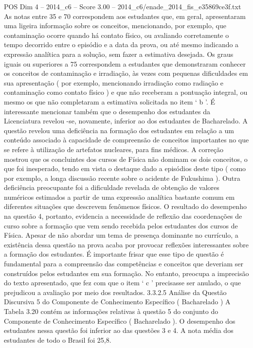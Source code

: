 \begin{textsample}{POS Dim 4 – 2014\_c6 – Score 3.00 – 2014\_c6/enade\_2014\_fis\_e35869ce3f.txt}
As notas entre 35 e 70 correspondem aos estudantes que, em geral, apresentaram uma ligeira informação sobre os conceitos, mencionando, por exemplo, que contaminação ocorre quando há contato físico, ou avaliando corretamente o tempo decorrido entre o episódio e a data da prova, ou até mesmo indicando a expressão analítica para a solução, sem fazer a estimativa desejada.
Os graus iguais ou superiores a 75 correspondem a estudantes que demonstraram conhecer os conceitos de contaminação e irradiação, às vezes com pequenas dificuldades em sua apresentação ( por exemplo, mencionando irradiação como radiação e contaminação como contato físico ) e que não receberam a pontuação integral, ou mesmo os que não completaram a estimativa solicitada no item ‘ b ’.
É interessante mencionar também que o desempenho dos estudantes da Licenciatura revelou -se, novamente, inferior ao dos estudantes de Bacharelado.
A questão revelou uma deficiência na formação dos estudantes em relação a um conteúdo associado à capacidade de compreensão de conceitos importantes no que se refere à utilização de artefatos nucleares, para fins médicos.
A correção mostrou que os concluintes dos cursos de Física não dominam os dois conceitos, o que foi inesperado, tendo em vista o destaque dado a episódios deste tipo ( como por exemplo, a longa discussão recente sobre o acidente de Fukushima ).
Outra deficiência preocupante foi a dificuldade revelada de obtenção de valores numéricos estimados a partir de uma expressão analítica bastante comum em diferentes situações que descrevem fenômenos físicos.
O resultado do desempenho na questão 4, portanto, evidencia a necessidade de reflexão das coordenações de curso sobre a formação que vem sendo recebida pelos estudantes dos cursos de Física.
Apesar de não abordar um tema de presença dominante no currículo, a existência dessa questão na prova acaba por provocar reflexões interessantes sobre a formação dos estudantes.
É importante frisar que esse tipo de questão é fundamental para a compreensão das competências e conceitos que deveriam ser construídos pelos estudantes em sua formação.
No entanto, preocupa a imprecisão do texto apresentado, que fez com que o item ‘ c ’ precisasse ser anulado, o que prejudicou a avaliação por meio dos resultados. 3.3.2.5 Análise da Questão Discursiva 5 do Componente de Conhecimento Específico ( Bacharelado ) A Tabela 3.20 contém as informações relativas à questão 5 do conjunto do Componente de Conhecimento Específico ( Bacharelado ).
O desempenho dos estudantes nessa questão foi inferior ao das questões 3 e 4.
A nota média dos estudantes de todo o Brasil foi 25,8.

\end{textsample}
